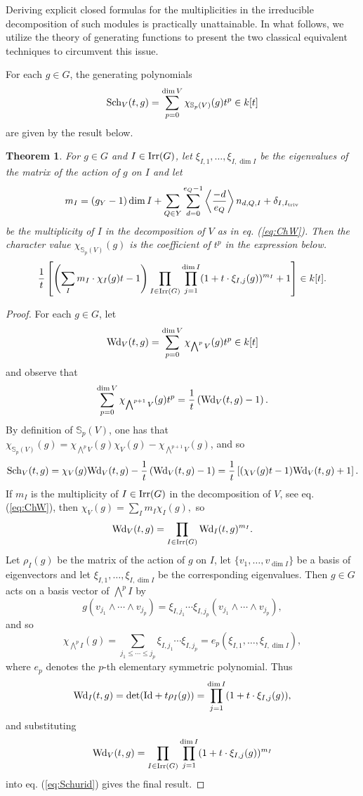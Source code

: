 \documentclass[10pt]{amsart}
\newtheorem{theorem}{Theorem}[subsection]
\theoremstyle{definition}
\begin{document}
Deriving explicit closed formulas for the multiplicities in the irreducible decomposition of such modules is  practically unattainable. In what follows, we utilize the theory of generating functions to present the two classical equivalent techniques to circumvent this issue.

For each $g\in G$, the generating polynomials
\[
{\rm Sch}_V(t,g)=\sum_{p=0}^{\dim V}\chi_{\mathbb{S}_p(V)}(g)t^p \in k[t]
\]
are given by the result below.

\begin{theorem}\label{th:genchars}
For $g\in G$ and $I\in{\rm Irr}(G)$, let $\xi_{I,1},\ldots,\xi_{I,\dim I}$ be the eigenvalues of the matrix of the action of $g$ on $I$ and let 
\[
m_I=(g_Y-1)\dim I+\sum_{Q\in Y}\sum_{d=0}^{e_Q-1}\left\langle \frac{-d}{e_Q}\right\rangle n_{d,Q,I}+\delta_{I,I_{\rm triv}}
\]
be the multiplicity of $I$ in the decomposition of $V$ as in eq. (\ref{eq:ChW}). Then the character value $\chi_{\mathbb{S}_p(V)}(g)$ is the coefficient of $t^p$ in the expression below.
\[
\frac{1}{t}
\left[
\left(
\sum_{I}m_I\cdot\chi_I(g)t-1
\right)
\prod_{I\in{\rm Irr}(G)}\prod_{j=1}^{\dim I}(1+t\cdot\xi_{I,j}(g))^{m_I}
+1
\right] \in k[t].
\]
\end{theorem}
\begin{proof}
For each $g\in G$, let
\[
{\rm Wd}_V(t,g)=\sum_{p=0}^{\dim V}\chi_{\bigwedge^p V}(g)t^p \in k[t]
\]
and observe that
\[
\sum_{p=0}^{\dim V}\chi_{\bigwedge^{p+1} V}(g)t^p=
\frac{1}{t}\left({\rm Wd}_V(t,g)-1\right).
\]
By definition of $\mathbb{S}_p(V)$, one has that  $\chi_{\mathbb{S}_p(V)}(g)=\chi_{\bigwedge^p V}(g)\chi_V(g)-\chi_{\bigwedge^{p+1} V}(g)$, and so 
\begin{equation}\label{eq:Schurid}
{\rm Sch}_V(t,g)
=
\chi_V(g){\rm Wd}_V(t,g)-\frac{1}{t}\left({\rm Wd}_V(t,g)-1\right)
=
\frac{1}{t}
\left[
(
\chi_V(g)t-1
)
{\rm Wd}_V(t,g)
+1
\right].
\end{equation}
If $m_I$ is the multiplicity of $I\in{\rm Irr}(G)$ in the decomposition of $V$, see eq. (\ref{eq:ChW}), then
$
\chi_V(g)=\sum_{I}m_I\chi_I(g),
$
so
\[
{\rm Wd}_V(t,g)=\prod_{I\in{\rm Irr}(G)} {\rm Wd}_I(t,g)^{m_I}.
\]
Let $\rho_I(g)$ be the matrix of the action of $g$ on $I$, let  $\{ v_1,\ldots,v_{\dim I}\}$ be a basis of eigenvectors and let $\xi_{I,1},\ldots,\xi_{I,\dim I}$ be the corresponding eigenvalues. Then $g\in G$ acts on a basis vector of $\bigwedge^p I$ by
\[
g(v_{j_1}\wedge\cdots\wedge v_{j_p})=\xi_{I,j_1}\cdots\xi_{I,j_p}(v_{j_1}\wedge\cdots\wedge v_{j_p}),
\]
and so
\[
\chi_{\bigwedge^p I}(g)=\sum_{ j_1\leq \cdots \leq j_p}\xi_{I,j_1}\cdots\xi_{I,j_p}=e_p(\xi_{I,1},\ldots,\xi_{I,\dim I}),
\]
where $e_p$ denotes the $p$-th elementary symmetric polynomial. Thus
\[
{\rm Wd}_I(t,g)=\det ({\rm Id}+t\rho_I(g))=\prod_{j=1}^{\dim I}(1+t\cdot\xi_{I,j}(g)),
\]
and substituting 
\[
{\rm Wd}_V(t,g)=\prod_{I\in{\rm Irr}(G)}\prod_{j=1}^{\dim I}(1+t\cdot\xi_{I,j}(g))^{m_I}
\]
into eq. (\ref{eq:Schurid}) gives the final result.
\end{proof}
\end{document}
